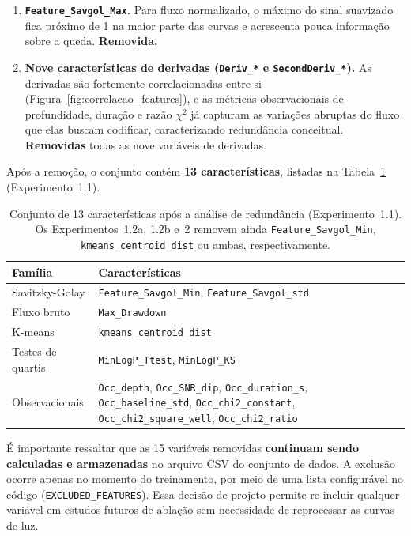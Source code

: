 \begin{enumerate}
	\item \textbf{\texttt{Feature\_Savgol\_Max}.}
	Para fluxo normalizado, o máximo do sinal suavizado fica próximo de 1 na maior parte das curvas e acrescenta pouca informação sobre a queda. \textbf{Removida.}

	\item \textbf{Nove características de derivadas (\texttt{Deriv\_*} e \texttt{SecondDeriv\_*}).}
	As derivadas são fortemente correlacionadas entre si (Figura~\ref{fig:correlacao_features}), e as métricas observacionais de profundidade, duração e razão $\chi^2$ já capturam as variações abruptas do fluxo que elas buscam codificar, caracterizando redundância conceitual. \textbf{Removidas} todas as nove variáveis de derivadas.
\end{enumerate}

Após a remoção, o conjunto contém \textbf{13 características}, listadas na Tabela~\ref{tab:features_final} (Experimento~1.1).

\begin{table}[htbp]
\centering
\caption{Conjunto de 13 características após a análise de redundância (Experimento~1.1). Os Experimentos~1.2a, 1.2b e~2 removem ainda \texttt{Feature\_Savgol\_Min}, \texttt{kmeans\_centroid\_dist} ou ambas, respectivamente.}
\label{tab:features_final}
\begin{tabular}{lp{8.6cm}}
\hline
\textbf{Família} & \textbf{Características} \\
\hline
Savitzky-Golay & \texttt{Feature\_Savgol\_Min}, \texttt{Feature\_Savgol\_std} \\
Fluxo bruto & \texttt{Max\_Drawdown} \\
K-means & \texttt{kmeans\_centroid\_dist} \\
Testes de quartis & \texttt{MinLogP\_Ttest}, \texttt{MinLogP\_KS} \\
Observacionais & \texttt{Occ\_depth}, \texttt{Occ\_SNR\_dip}, \texttt{Occ\_duration\_s}, \texttt{Occ\_baseline\_std}, \texttt{Occ\_chi2\_constant}, \texttt{Occ\_chi2\_square\_well}, \texttt{Occ\_chi2\_ratio} \\
\hline
\end{tabular}
\end{table}

É importante ressaltar que as 15 variáveis removidas \textbf{continuam sendo calculadas e armazenadas} no arquivo CSV do conjunto de dados. A exclusão ocorre apenas no momento do treinamento, por meio de uma lista configurável no código (\texttt{EXCLUDED\_FEATURES}). Essa decisão de projeto permite re-incluir qualquer variável em estudos futuros de ablação sem necessidade de reprocessar as curvas de luz.

